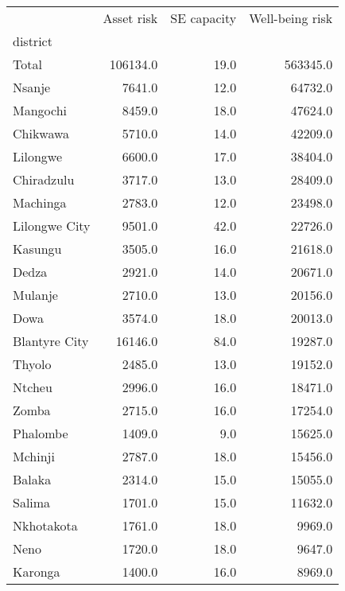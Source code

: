 \begin{tabular}{lrrr}
\toprule
{} &  Asset risk &  SE capacity &  Well-being risk \\
district      &             &              &                  \\
\midrule
Total         &    106134.0 &         19.0 &         563345.0 \\
Nsanje        &      7641.0 &         12.0 &          64732.0 \\
Mangochi      &      8459.0 &         18.0 &          47624.0 \\
Chikwawa      &      5710.0 &         14.0 &          42209.0 \\
Lilongwe      &      6600.0 &         17.0 &          38404.0 \\
Chiradzulu    &      3717.0 &         13.0 &          28409.0 \\
Machinga      &      2783.0 &         12.0 &          23498.0 \\
Lilongwe City &      9501.0 &         42.0 &          22726.0 \\
Kasungu       &      3505.0 &         16.0 &          21618.0 \\
Dedza         &      2921.0 &         14.0 &          20671.0 \\
Mulanje       &      2710.0 &         13.0 &          20156.0 \\
Dowa          &      3574.0 &         18.0 &          20013.0 \\
Blantyre City &     16146.0 &         84.0 &          19287.0 \\
Thyolo        &      2485.0 &         13.0 &          19152.0 \\
Ntcheu        &      2996.0 &         16.0 &          18471.0 \\
Zomba         &      2715.0 &         16.0 &          17254.0 \\
Phalombe      &      1409.0 &          9.0 &          15625.0 \\
Mchinji       &      2787.0 &         18.0 &          15456.0 \\
Balaka        &      2314.0 &         15.0 &          15055.0 \\
Salima        &      1701.0 &         15.0 &          11632.0 \\
Nkhotakota    &      1761.0 &         18.0 &           9969.0 \\
Neno          &      1720.0 &         18.0 &           9647.0 \\
Karonga       &      1400.0 &         16.0 &           8969.0 \\

\end{tabular}
